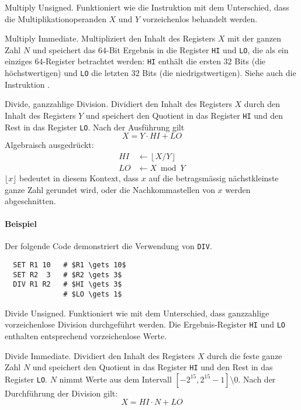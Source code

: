\glqq Multiply Unsigned\grqq.
Funktioniert wie die Instruktion  mit dem Unterschied, dass die
Multiplikationoperanden $X$ und $Y$ vorzeichenlos behandelt werden. 



\glqq Multiply Immediate\grqq.
Multipliziert den Inhalt des Registers $X$ mit der ganzen Zahl $N$ und speichert
das $64$-Bit Ergebnis in die Register \texttt{HI} und \texttt{LO}, die als ein
einziges $64$-Register betrachtet werden: \texttt{HI} enthält die ersten $32$
Bits (die höchstwertigen) und \texttt{LO} die letzten 32 Bits (die
niedrigstwertigen).
Siehe auch die Instruktion .



\glqq Divide\grqq, ganzzahlige Division.
Dividiert den Inhalt des Registers $X$ durch den Inhalt des Registers $Y$ und
speichert den Quotient in das Register \texttt{HI} und den Rest in das Register
\texttt{LO}.
Nach der Ausführung gilt
\[
    X = Y \cdot HI + LO
\]
Algebraisch ausgedrückt:
\begin{align*}
  HI & \gets \left\lfloor X/Y \right\rfloor \\
  LO & \gets X \bmod Y
\end{align*}
$\lfloor x \rfloor$ bedeutet in diesem Kontext, dass $x$ auf die betragsmässig
nächstkleinste ganze Zahl gerundet wird, oder die Nachkommastellen von $x$
werden abgeschnitten.

\paragraph{Beispiel}
Der folgende Code demonstriert die Verwendung von \texttt{DIV}.
\begin{lstlisting}
  SET R1 10   # $R1 \gets 10$
  SET R2  3   # $R2 \gets 3$
  DIV R1 R2   # $HI \gets 3$
              # $LO \gets 1$
\end{lstlisting}




\glqq Divide Unsigned\grqq.
Funktioniert wie  mit dem Unterschied, dass ganzzahlige
vorzeichenlose Division durchgeführt werden. Die Ergebnis-Register \texttt{HI}
und \texttt{LO} enthalten entsprechend vorzeichenlose Werte.




\glqq Divide Immediate\grqq.
Dividiert den Inhalt des Registers $X$ durch die feste ganze Zahl $N$ und
speichert den Quotient in das Register \texttt{HI} und den Rest in das Register
\texttt{LO}.
$N$ nimmt Werte aus dem Intervall $[-2^{15}, 2^{15}-1] \setminus 0$.
Nach der Durchführung der Division gilt:
\[
    X = HI \cdot N + LO 
\]
